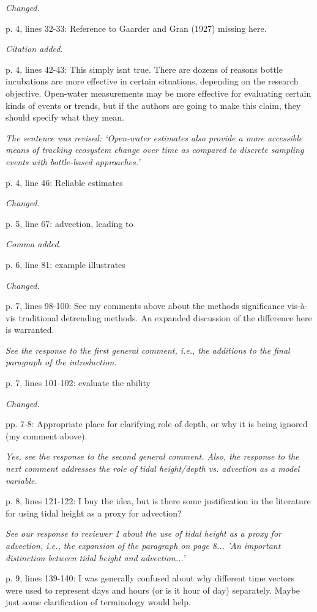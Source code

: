 \documentclass[letterpaper,12pt]{article}\usepackage[]{graphicx}\usepackage[]{color}
\begin{document}
{\it Changed.}

p. 4, lines 32-33: Reference to Gaarder and Gran (1927) missing here.

{\it Citation added.}

p. 4, lines 42-43: This simply isnt true. There are dozens of reasons bottle incubations are more effective in certain situations, depending on the research objective. Open-water measurements may be more effective for evaluating certain kinds of events or trends, but if the authors are going to make this claim, they should specify what they mean.

{\it The sentence was revised: `Open-water estimates also provide a more accessible means of tracking ecosystem change over time as compared to discrete sampling events with bottle-based approaches.'}

p. 4, line 46: Reliable estimates

{\it Changed.}

p. 5, line 67: advection, leading to

{\it Comma added.}

p. 6, line 81: example illustrates

{\it Changed.}

p. 7, lines 98-100: See my comments above about the methods significance vis-à-vis traditional detrending methods. An expanded discussion of the difference here is warranted.

{\it See the response to the first general comment, i.e., the additions to the final paragraph of the introduction.}

p. 7, lines 101-102: evaluate the ability

{\it Changed.}

pp. 7-8: Appropriate place for clarifying role of depth, or why it is being ignored (my comment above).

{\it Yes, see the response to the second general comment.  Also, the response to the next comment addresses the role of tidal height/depth vs. advection as a model variable.}

p. 8, lines 121-122: I buy the idea, but is there some justification in the literature for using tidal height as a proxy for advection?

{\it See our response to reviewer 1 about the use of tidal height as a proxy for advection, i.e., the expansion of the paragraph on page 8... 'An important distinction between tidal height and advection...'}

p. 9, lines 139-140: I was generally confused about why different time vectors were used to represent days and hours (or is it hour of day) separately. Maybe just some clarification of terminology would help.
\end{document}
